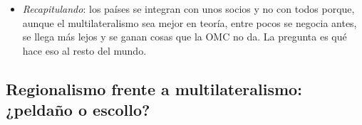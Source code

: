 \documentclass[11pt]{article}
\begin{document}
\begin{itemize}
\begin{itemize}
  \item \emph{la escala, la competencia y el crecimiento}: un mercado mayor permite aprovechar economías de escala, aumenta la competencia y atrae inversión directa ;
  \item \emph{la economía política}: es más fácil negociar entre pocos y vecinos; y un acuerdo es más viable cuando desvía comercio, porque los productores del socio ganan cuota a costa de terceros y lo apoyan\nocite{GrossmanHelpman1995Politics};
  \item \emph{las ganancias no tradicionales}\nocite{FernandezPortes1998}: el acuerdo puede servir de \emph{compromiso} para que las reformas no tengan vuelta atrás (México con el TLCAN en 1994), de \emph{señal} ante los inversores, de \emph{seguro} de acceso al mercado del socio grande o de instrumento de poder de negociación y de seguridad (la ASEAN nació en plena guerra fría).
  \end{itemize}
\item \emph{Recapitulando}: los países se integran con unos socios y no con todos porque, aunque el multilateralismo sea mejor en teoría, entre pocos se negocia antes, se llega más lejos y se ganan cosas que la OMC no da. La pregunta es qué hace eso al resto del mundo.
\end{itemize}

\subsection{Regionalismo frente a multilateralismo:\cortetitulo{} ¿peldaño o escollo?}\label{sec:debate}
\end{document}
